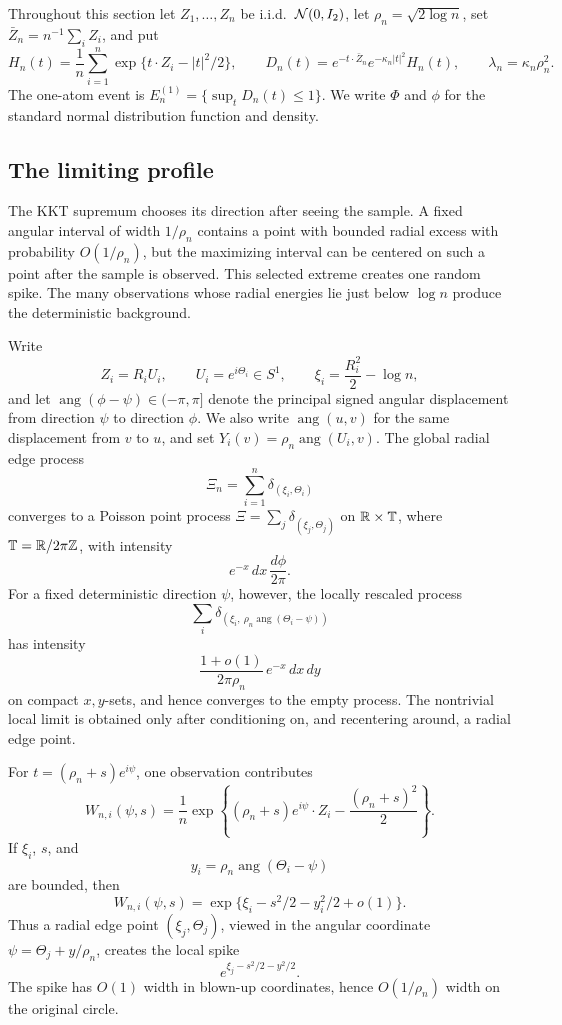 Throughout this section let \(Z_1,\dots,Z_n\) be i.i.d.\ \(\mathcal N(0,I_2)\), let
\(\rho_n=\sqrt{2\log n}\), set \(\bar Z_n=n^{-1}\sum_iZ_i\), and put
\[
    H_n(t)=\frac1n\sum_{i=1}^n\exp\{t\cdot Z_i-|t|^2/2\},
    \qquad
    D_n(t)=e^{-t\cdot\bar Z_n}e^{-\kappa_n|t|^2}H_n(t),
    \qquad
    \lambda_n=\kappa_n\rho_n^2 .
\]
The one-atom event is \(E_n^{(1)}=\{\sup_tD_n(t)\le1\}\).
We write \(\Phi\) and \(\phi\) for the standard normal distribution
function and density.

\subsection{The limiting profile}

The KKT supremum chooses its direction after seeing the sample. A fixed
angular interval of width \(1/\rho_n\) contains a point with bounded radial
excess with probability \(O(1/\rho_n)\), but the maximizing interval can be
centered on such a point after the sample is observed. This selected extreme
creates one random spike. The many observations whose radial energies lie
just below \(\log n\) produce the deterministic background.

Write
\[
    Z_i=R_iU_i,\qquad U_i=e^{i\Theta_i}\in S^1,\qquad
    \xi_i=\frac{R_i^2}{2}-\log n ,
\]
and let \(\operatorname{ang}(\phi-\psi)\in(-\pi,\pi]\) denote the principal
signed angular displacement from direction \(\psi\) to direction \(\phi\). We
also write \(\operatorname{ang}(u,v)\) for the same displacement from \(v\) to
\(u\), and set \(Y_i(v)=\rho_n\operatorname{ang}(U_i,v)\). The global radial edge process
\[
    \Xi_n=\sum_{i=1}^n\delta_{(\xi_i,\Theta_i)}
\]
converges to a Poisson point process \(\Xi=\sum_j\delta_{(\xi_j,\Theta_j)}\)
on \(\mathbb R\times\mathbb T\), where \(\mathbb T=\mathbb R/2\pi\mathbb Z\), with intensity
\[
    e^{-x}\,dx\,\frac{d\phi}{2\pi}.
\]
For a fixed deterministic direction \(\psi\), however, the locally rescaled
process
\[
    \sum_i
    \delta_{\left(\xi_i,\ \rho_n\operatorname{ang}(\Theta_i-\psi)\right)}
\]
has intensity
\[
    \frac{1+o(1)}{2\pi\rho_n}\,e^{-x}\,dx\,dy
\]
on compact \(x,y\)-sets, and hence converges to the empty process. The
nontrivial local limit is obtained only after conditioning on, and recentering
around, a radial edge point.

For \(t=(\rho_n+s)e^{i\psi}\), one observation contributes
\[
    W_{n,i}(\psi,s)
    =
    \frac1n
    \exp\left\{(\rho_n+s)e^{i\psi}\cdot Z_i
        -\frac{(\rho_n+s)^2}{2}\right\}.
\]
If \(\xi_i\), \(s\), and
\[
    y_i=\rho_n\operatorname{ang}(\Theta_i-\psi)
\]
are bounded, then
\[
    W_{n,i}(\psi,s)
    =
    \exp\{\xi_i-s^2/2-y_i^2/2+o(1)\}.
\]
Thus a radial edge point \((\xi_j,\Theta_j)\), viewed in the angular coordinate
\(\psi=\Theta_j+y/\rho_n\), creates the local spike
\[
    e^{\xi_j-s^2/2-y^2/2}.
\]
The spike has \(O(1)\) width in blown-up coordinates, hence
\(O(1/\rho_n)\) width on the original circle.

